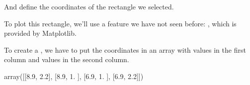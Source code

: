 \documentclass[letterpaper,10pt,english]{sphinxmanual}
\begin{document}
\begin{sphinxVerbatim}[commandchars=\\\{\}]
   

   
\end{sphinxVerbatim}

And define the coordinates of the rectangle we selected.

\begin{sphinxVerbatim}[commandchars=\\\{\}]
  
  
  
   

  \PYG{p}{[}   \PYG{p}{]}
  \PYG{p}{[}   \PYG{p}{]}
\end{sphinxVerbatim}

To plot this rectangle, we’ll use a feature we have not seen before: , which is provided by Matplotlib.

To create a , we have to put the coordinates in an array with  values in the first column and  values in the second column.

\begin{sphinxVerbatim}[commandchars=\\\{\}]
   

  \PYG{p}{[} \PYG{p}{]}
\end{sphinxVerbatim}

\begin{sphinxVerbatim}[commandchars=\\\{\}]
array([[\PYGZhy{}8.9, \PYGZhy{}2.2],
       [\PYGZhy{}8.9,  1. ],
       [\PYGZhy{}6.9,  1. ],
       [\PYGZhy{}6.9, \PYGZhy{}2.2]])
\end{sphinxVerbatim}
\end{document}
